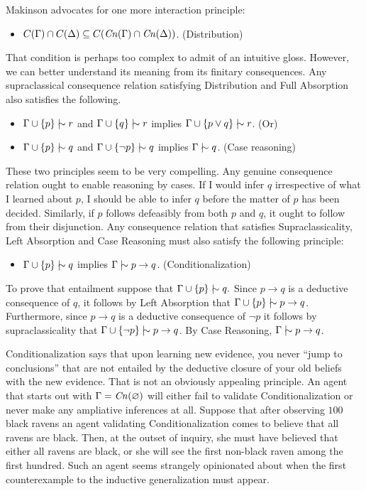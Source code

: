 Makinson advocates for one more interaction principle:
\begin{itemize}
\item[] $C(\Gamma) \cap C(\Delta) \subseteq C(\text{\textit{Cn}}(\Gamma) \cap \text{\textit{Cn}}(\Delta))$.
\hfill(Distribution)
\end{itemize}
That condition is perhaps too complex to admit of an intuitive gloss. However,
we can better understand its meaning from its finitary consequences. Any
supraclassical consequence relation satisfying Distribution and Full Absorption
also satisfies the following.
\begin{itemize}
\item[] $\Gamma \cup \{p\} \mathrel{\mid\hspace{-.08em}\!\sim} r$ and $\Gamma \cup \{q\} \mathrel{\mid\hspace{-.08em}\!\sim} r$ implies $\Gamma
\cup \{ p \vee q \}\mathrel{\mid\hspace{-.08em}\!\sim} r$. \hfill (Or)
\item[] $\Gamma \cup \{p\} \mathrel{\mid\hspace{-.08em}\!\sim} q$ and $\Gamma \cup \{\neg p\} \mathrel{\mid\hspace{-.08em}\!\sim} q$ implies
$\Gamma \mathrel{\mid\hspace{-.08em}\!\sim} q$. \hfill(Case reasoning)
\end{itemize}
These two principles seem to be very compelling. Any genuine consequence
relation ought to enable reasoning by cases. If I would infer $q$ irrespective
of what I learned about  $p$, I should be able to infer $q$ before the matter of
$p$ has been decided. Similarly, if $p$ follows defeasibly from both $p$ and
$q$, it ought to follow from their disjunction. Any consequence relation that
satisfies Supraclassicality, Left Absorption and Case Reasoning must also
satisfy the following principle:
\begin{itemize}
\item[] $\Gamma \cup \{p\} \mathrel{\mid\hspace{-.08em}\!\sim} q$ implies $\Gamma \mathrel{\mid\hspace{-.08em}\!\sim} p \rightarrow q$.
\hfill(Conditionalization)
\end{itemize}
To prove that entailment suppose that $\Gamma \cup \{p\} \mathrel{\mid\hspace{-.08em}\!\sim} q.$ Since
$p\rightarrow q$ is a deductive consequence of $q$, it follows by Left
Absorption that $\Gamma \cup \{ p \} \mathrel{\mid\hspace{-.08em}\!\sim} p \rightarrow q$. Furthermore, since
$p\rightarrow q$ is a deductive consequence of $\neg p$ it follows by
supraclassicality that $\Gamma \cup \{ \neg p \} \mathrel{\mid\hspace{-.08em}\!\sim} p \rightarrow q$. By Case
Reasoning, $\Gamma \mathrel{\mid\hspace{-.08em}\!\sim} p \rightarrow q$.

Conditionalization says that upon learning new evidence, you never ``jump to
conclusions'' that are not entailed by the deductive closure of your old beliefs
with the new evidence. That is not an obviously appealing principle. An agent
that  starts out with $\Gamma = \text{\textit{Cn}}(\varnothing)$ will either fail to validate
Conditionalization or never make any ampliative inferences at all. Suppose that
after observing $100$ black ravens an agent validating Conditionalization comes
to believe that all ravens are black. Then, at the outset of inquiry, she must
have believed that either all ravens are black, or she will see the first
non-black raven among the first hundred. Such an agent seems strangely
opinionated about when the first counterexample to the inductive generalization
must appear.

